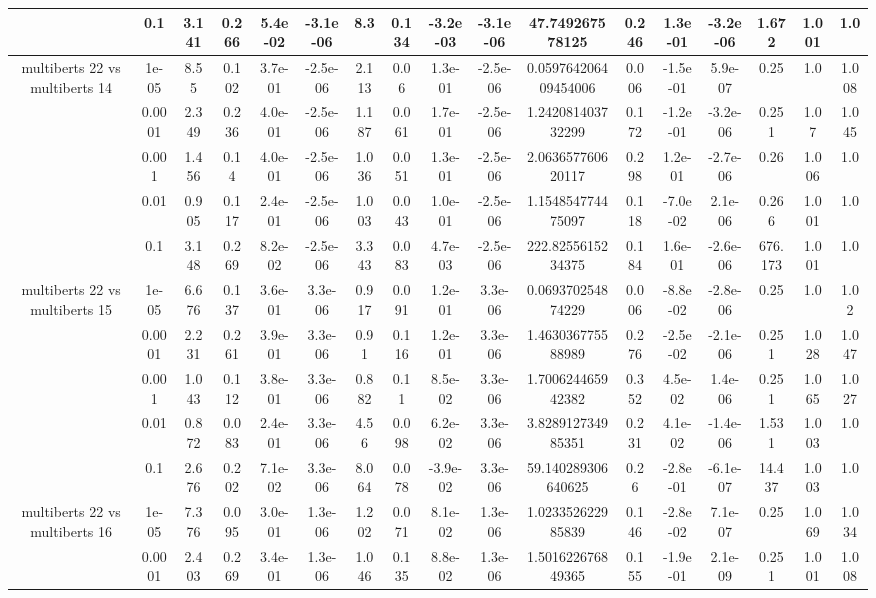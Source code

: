 \begin{tabular}{|c|c|c|c|c|c|c|c|c|c|c|c|c|c|c|c|c|}
 & 0.1 & 3.141 & 0.266 & 5.4e-02 & -3.1e-06 & 8.3 & 0.134 & -3.2e-03 & -3.1e-06 & 47.749267578125 & 0.246 & 1.3e-01 & -3.2e-06 & 1.672 & 1.001 & 1.0 \\
\hline
\multirow{5}{*}{multiberts 22 vs multiberts 14} & 1e-05 & 8.55 & 0.102 & 3.7e-01 & -2.5e-06 & 2.113 & 0.06 & 1.3e-01 & -2.5e-06 & 0.059764206409454006 & 0.006 & -1.5e-01 & 5.9e-07 & 0.25 & 1.0 & 1.008 \\
 & 0.0001 & 2.349 & 0.236 & 4.0e-01 & -2.5e-06 & 1.187 & 0.061 & 1.7e-01 & -2.5e-06 & 1.242081403732299 & 0.172 & -1.2e-01 & -3.2e-06 & 0.251 & 1.07 & 1.045 \\
 & 0.001 & 1.456 & 0.14 & 4.0e-01 & -2.5e-06 & 1.036 & 0.051 & 1.3e-01 & -2.5e-06 & 2.063657760620117 & 0.298 & 1.2e-01 & -2.7e-06 & 0.26 & 1.006 & 1.0 \\
 & 0.01 & 0.905 & 0.117 & 2.4e-01 & -2.5e-06 & 1.003 & 0.043 & 1.0e-01 & -2.5e-06 & 1.154854774475097 & 0.118 & -7.0e-02 & 2.1e-06 & 0.266 & 1.001 & 1.0 \\
 & 0.1 & 3.148 & 0.269 & 8.2e-02 & -2.5e-06 & 3.343 & 0.083 & 4.7e-03 & -2.5e-06 & 222.8255615234375 & 0.184 & 1.6e-01 & -2.6e-06 & 676.173 & 1.001 & 1.0 \\
\hline
\multirow{5}{*}{multiberts 22 vs multiberts 15} & 1e-05 & 6.676 & 0.137 & 3.6e-01 & 3.3e-06 & 0.917 & 0.091 & 1.2e-01 & 3.3e-06 & 0.069370254874229 & 0.006 & -8.8e-02 & -2.8e-06 & 0.25 & 1.0 & 1.02 \\
 & 0.0001 & 2.231 & 0.261 & 3.9e-01 & 3.3e-06 & 0.91 & 0.116 & 1.2e-01 & 3.3e-06 & 1.463036775588989 & 0.276 & -2.5e-02 & -2.1e-06 & 0.251 & 1.028 & 1.047 \\
 & 0.001 & 1.043 & 0.112 & 3.8e-01 & 3.3e-06 & 0.882 & 0.11 & 8.5e-02 & 3.3e-06 & 1.700624465942382 & 0.352 & 4.5e-02 & 1.4e-06 & 0.251 & 1.065 & 1.027 \\
 & 0.01 & 0.872 & 0.083 & 2.4e-01 & 3.3e-06 & 4.56 & 0.098 & 6.2e-02 & 3.3e-06 & 3.828912734985351 & 0.231 & 4.1e-02 & -1.4e-06 & 1.531 & 1.003 & 1.0 \\
 & 0.1 & 2.676 & 0.202 & 7.1e-02 & 3.3e-06 & 8.064 & 0.078 & -3.9e-02 & 3.3e-06 & 59.140289306640625 & 0.26 & -2.8e-01 & -6.1e-07 & 14.437 & 1.003 & 1.0 \\
\hline
\multirow{5}{*}{multiberts 22 vs multiberts 16} & 1e-05 & 7.376 & 0.095 & 3.0e-01 & 1.3e-06 & 1.202 & 0.071 & 8.1e-02 & 1.3e-06 & 1.023352622985839 & 0.146 & -2.8e-02 & 7.1e-07 & 0.25 & 1.069 & 1.034 \\
 & 0.0001 & 2.403 & 0.269 & 3.4e-01 & 1.3e-06 & 1.046 & 0.135 & 8.8e-02 & 1.3e-06 & 1.501622676849365 & 0.155 & -1.9e-01 & 2.1e-09 & 0.251 & 1.001 & 1.008 \\

\end{tabular}
